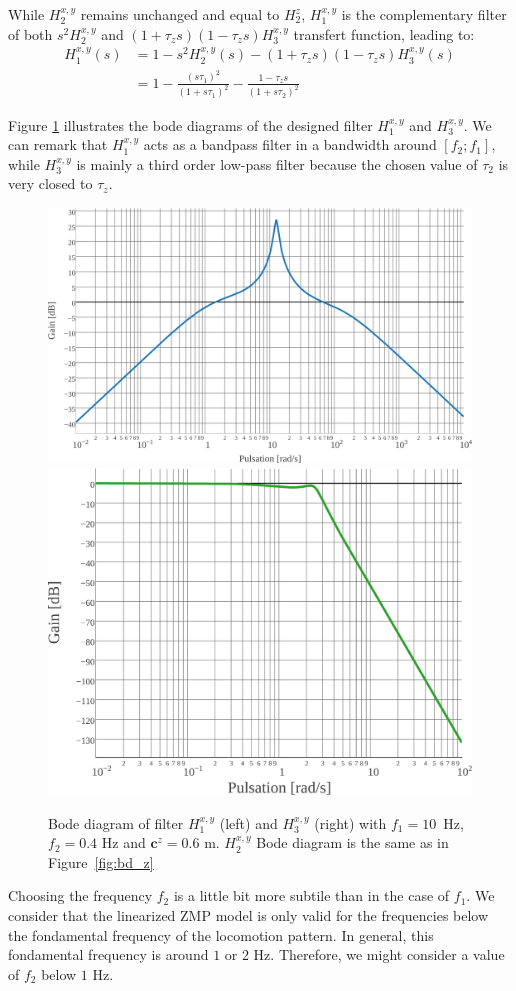 While $H^{x,y}_{2}$ remains unchanged and equal to $H^{z}_{2}$, $H^{x,y}_{1}$ is the complementary filter of both $s^{2}H^{x,y}_{2}$ and \mbox{$(1 + \tau_{z}s)(1 - \tau_{z}s)H^{x,y}_{3}$} transfert function, leading to:
\begin{align} 
  H^{x,y}_{1}(s) &= 1 - s^{2}H^{x,y}_{2}(s) - (1 + \tau_{z}s)(1 - \tau_{z}s)H^{x,y}_{3}(s)\nonumber
  \\&= 1 - \frac{{(s\tau_{1})}^{2}}{(1+s\tau_{1})^{2}} - \frac{1 - \tau_{z}s}{(1+s\tau_{2})^{2}}
\end{align}

Figure \ref{fig:bd_xy} illustrates the bode diagrams of the designed filter  $H^{x,y}_{1}$ and $H^{x,y}_{3}$. We can remark that $H^{x,y}_{1}$ acts as a bandpass filter in a bandwidth around $\left[f_{2}; f_{1} \right]$, while $H^{x,y}_{3}$ is mainly a third order low-pass filter because the chosen value of $\tau_{2}$ is very closed to $\tau_{z}$.
\begin{figure}
  \begin{center}
    \includegraphics[width=0.54\columnwidth]{fig/H1_xy}
    \includegraphics[width=0.44\columnwidth]{fig/H3_xy}
  \end{center}
  \caption{Bode diagram of filter $H^{x,y}_{1}$ (left) and $H^{x,y}_{3}$ (right) with \mbox{$f_{1} = 10$ Hz}, $f_{2} = 0.4$ Hz and $\bm c^{z} = 0.6$ m. $H^{x,y}_{2}$ Bode diagram is the same as in Figure~\ref{fig:bd_z}}
  \label{fig:bd_xy}
\end{figure}

Choosing the frequency $f_{2}$ is a little bit more subtile than in the case of $f_{1}$. We consider that the linearized ZMP model is only valid for the frequencies below the fondamental frequency of the locomotion pattern. In general, this fondamental frequency is around $1$ or $2$ Hz. Therefore, we might consider a value of $f_{2}$ below $1$ Hz. 
